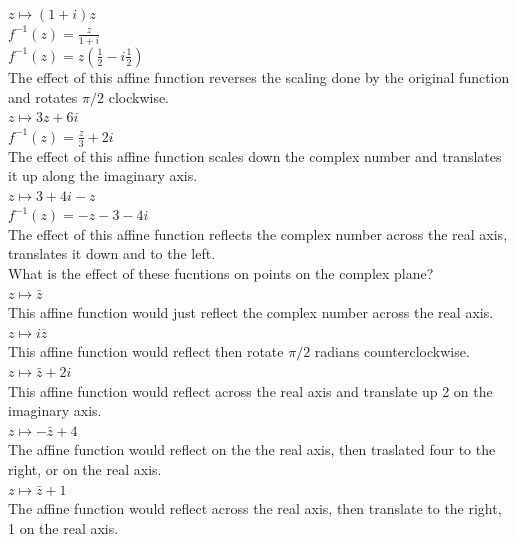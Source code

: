 \documentclass[12pt]{article}
\begin{document}
 $z \mapsto (1 + i)z$\\
$f^{-1}(z) = \frac{z}{1+i}$\\
$f^{-1}(z) = z(\frac{1}{2} - i\frac{1}{2})$\\
The effect of this affine function reverses the scaling done by the original function and rotates $\pi/2$ clockwise.\\

 $z \mapsto 3z + 6i$\\
$f^{-1}(z) = \frac{z}{3} + 2i$\\
The effect of this affine function scales down the complex number and translates it up along the imaginary axis.\\

 $z \mapsto 3 + 4i - z$\\
$f^{-1}(z) = -z - 3 - 4i$\\
The effect of this affine function reflects the complex number across the real axis, translates it down and to the left.\\



 What is the effect of these fucntions on points on the complex plane?\\

 $z \mapsto \bar{z}$\\
This affine function would just reflect the complex number across the real axis.\\

 $z \mapsto i\overline{z}$\\
This affine function would reflect then rotate $\pi/2$ radians counterclockwise.\\

 $z \mapsto \bar{z} + 2i$\\
This affine function would reflect across the real axis and translate up 2 on the imaginary axis.\\

 $z \mapsto -\bar{z} + 4$\\
The affine function would reflect on the the real axis, then traslated four to the right, or on the real axis.\\

 $z \mapsto \bar{z} + 1$\\
The affine function would reflect across the real axis, then translate to the right, 1 on the real axis.\\
\end{document}
